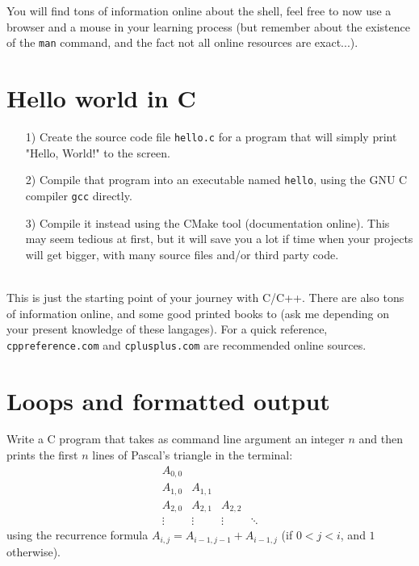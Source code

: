 \documentclass[a4paper,12pt]{article}
\begin{document}
\medskip\noindent
You will find tons of information online about the shell, feel free to now use a
browser and a mouse in your learning process (but remember about the existence
of the {\tt man} command, and the fact not all online resources are exact...).

\medskip


\section{Hello world in C}

\begin{itemize}

\item[1)] Create the source code file {\tt hello.c} for a program that will simply print "Hello, World!" to the screen.
\item[2)] Compile that program into an executable named {\tt hello}, using the
	GNU C compiler {\tt gcc} directly.
\item[3)] Compile it instead using the CMake tool (documentation online). This may seem tedious at
	first, but it will save you a lot if time when your projects will get
		bigger, with many source files and/or third party code.

\end{itemize}

\quad\\
This is just the starting point of your journey with C/C++. There are also tons of information online, and some good printed books to (ask me depending on your present knowledge of these langages). For a quick reference, {\tt cppreference.com} and {\tt cplusplus.com} are recommended online sources.\\


\section{Loops and formatted output}
Write a C program that takes as command line argument an integer $n$ and then prints the first $n$ lines of Pascal's triangle in the terminal:
$$
\begin{array}{llll}
A_{0,0}\\
A_{1,0} & A_{1,1}\\
A_{2,0} & A_{2,1} & A_{2,2}\\
\vdots & \vdots & \vdots& \ddots
\end{array}
$$
using the recurrence formula $A_{i,j} = A_{i-1,j-1} + A_{i-1,j}$ (if $0 < j < i$, and $1$ otherwise). 
\end{document}
